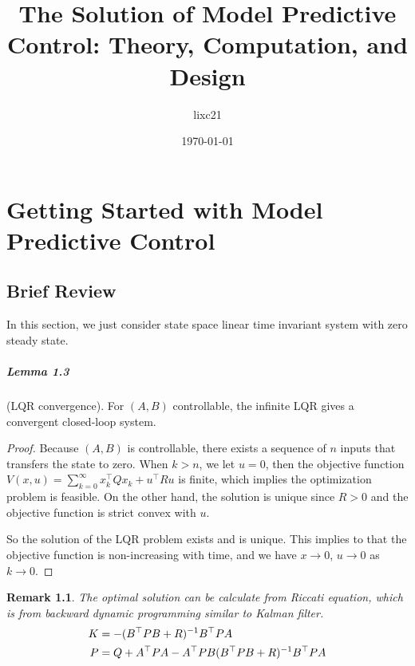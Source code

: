\documentclass[11pt,a4paper]{report}
\title{The Solution of Model Predictive Control: Theory, Computation, and Design \cite{rawlings2017model}}
\author{lixc21}
\date{\today}
\newtheorem*{remark}{Remark}
\theoremstyle{definition}\newtheorem{exercise}{Exercise}[chapter]
\begin{document}
\maketitle
\tableofcontents
\chapter{Getting Started with Model Predictive Control}
\section{Brief Review}
In this section, we just consider state space linear time invariant system with zero steady state.

\paragraph{Lemma 1.3} (LQR convergence). For $(A,B)$ controllable, the infinite LQR gives a convergent closed-loop system.
\begin{proof}
Because $(A,B)$ is controllable, there exists a sequence of $n$ inputs that transfers the state to zero. When $k>n$, we let $u=0$, then the objective function $V(x,u)=\sum_{k=0}^\infty x_k^\top Qx_k+u^\top Ru$ is finite, which implies the optimization problem is feasible. On the other hand, the solution is unique since $R>0$ and the objective function is strict convex with $u$.

So the solution of the LQR problem exists and is unique. This implies to that the objective function is non-increasing with time, and we have $x\to 0$, $u\to 0$ as $k\to 0$.
\end{proof}
\begin{remark}
The optimal solution can be calculate from Riccati equation, which is from backward dynamic programming similar to Kalman filter.
\begin{equation}\notag
\begin{aligned}
K&=-(B^\top PB+R)^{-1} B^\top PA\\
P&=Q+A^\top PA-A^\top PB(B^\top PB+R)^{-1}B^\top PA
\end{aligned}
\end{equation}
\end{remark}
\end{document}
